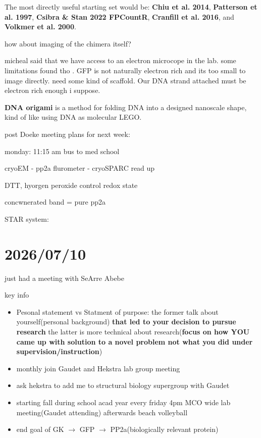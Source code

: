 \documentclass{article}
\begin{document}
The most directly useful starting set would be: \textbf{Chiu et al. 2014}, \textbf{Patterson et al. 1997}, \textbf{Csibra \& Stan 2022 FPCountR}, \textbf{Cranfill et al. 2016}, and \textbf{Volkmer et al. 2000}.


\begin{question}
 how about imaging of the chimera itself? 
\end{question}
\begin{solution}
 micheal said that we have access to an electron microcope in the lab.  some limitations found tho 
\href{https://pmc.ncbi.nlm.nih.gov/articles/PMC6478846/?utm_source=chatgpt.com}{\textbullet}. GFP is not naturally electron rich and its too small to image directly. need some kind of scaffold. Our DNA strand attached must be electron rich enough i suppose.
\end{solution}

\begin{definition}
  \textbf{DNA origami} is a method for folding DNA into a designed nanoscale shape, kind of like using DNA as molecular LEGO.
\end{definition}

post Doeke meeting plans for next week:
\begin{fact}
monday: 11:15 am  bus to med school

cryoEM - pp2a
flurometer - 
cryoSPARC read up

DTT, hyorgen peroxide control redox state

concwnerated band = pure pp2a

STAR system:
\end{fact}


\section{2026/07/10}
just had a meeting with SeArre Abebe
\begin{fact}
key info
\begin{itemize}
  \item Pesonal statement vs Statment of purpose: the former talk about yourself(personal background) \textbf{that led to your decision to pursue research} the latter is more technical about research(\textbf{focus on how YOU came up with solution to a novel problem not what you did under supervision/instruction})
  \item monthly join Gaudet and Hekstra lab group meeting
  \item ask hekstra to add me to structural biology supergroup with Gaudet
  \item starting fall during school acad year every friday 4pm MCO wide lab meeting(Gaudet attending) afterwards beach volleyball
  \item end goal of GK $\to $ GFP $\to $ PP2a(biologically relevant protein)
\end{itemize}
\end{fact}
\end{document}
